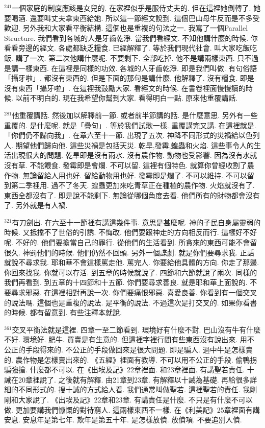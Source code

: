 \documentclass{book}
\begin{document}
$^{241}$一個家庭的制度應該是女兒的.
在家裡似乎是服侍丈夫的.
但在這裡她倒轉了.
她要喝酒.
還要叫丈夫拿東西給她.
所以這一節經文說到.
這個巴山母牛反而是不多受歡迎.
另外我和大家看平衡結構.
這個也是重複的句法之一.
我寫了一個Parallel Structure.
我們看到各城的人是牙齒乾淨.
當我們看經文.
不知他講什麼的時候.
你看看旁邊的經文.
各處都缺乏糧食.
已經解釋了.
等於我們現代社會.
叫大家吃飯吃飯.
講了一次.
第二次他講什麼呢.
不要剩下.
全部吃掉.
他不是講兩樣東西.
只不過是講一樣東西.
在這裡是同樣的功效.
各城的人牙齒乾淨.
即是我們叫做.
有句俗語「攝牙啦」.
都沒有東西的.
但是下面的那句是講什麼.
他解釋了.
沒有糧食.
即是沒有東西「攝牙啦」.
在這裡我鼓勵大家.
看經文的時候.
在書卷裡面慢慢讀的時候.
以前不明白的.
現在我希望你幫到大家.
看得明白一點.
原來他重覆講話.

$^{281}$他重覆講話.
然後加以解釋前一節.
或者前半節講的話.
是什麼意思.
另外有一些重覆的.
是什麼呢.
就是「疊句」.
等於我們試歌一樣.
重覆講完又講.
在這裡就是.
「你們仍不歸向我」.
在章六至十一節.
出現了五次.
神降不同形式的災禍給以色列人.
期望他們歸向他.
這些災禍是包括天災.
乾旱,發霉,蝗蟲和火焰.
這些事令人的生活出現很大的問題.
乾旱即是沒有雨水.
沒有農作物.
動物也受影響.
因為沒有水就沒有草.
不能餵食.
發霉即是會爛.
不可以留.
這裡有個特色.
就算你曾經收割了農作物.
無論留給人用也好.
留給動物用也好.
發霉即是爛了.
不可以維持.
不可以留到第二季裡用.
過不了冬天.
蝗蟲更加來吃青草正在種植的農作物.
火焰就沒有了.
東西全都沒有了.
即是說不能剩下.
無論從哪個角度去看.
他們所有的財物都會沒有了.
另外就是有人禍.

$^{321}$有刀劍出.
在六至十一節裡有講這幾件事.
意思是甚麼呢.
神的子民自身屬靈弱的時候.
又抵擋不了世俗的引誘.
不悔改.
他們要跟神走的方向相反而行.
這樣好不好呢.
不好的.
他們要擔當自己的罪行.
從他們的生活看到.
所貪來的東西可能不會留很久.
神罰他們的時候.
他們仍然不回頭.
另外一個諜劇.
就是你們要尋求我.
正話就說不尋求我.
耶和華不會這樣罵走他.
罵完人.
你要給他具體的方向.
你走了那邊.
你回來找我.
你就可以存活.
到五章的時候就說了.
四節和六節就說了兩次.
同樣的我們再看到.
到五章的十四節和十五節.
你們要尋求善良.
就是耶和華上面說的.
不要尋求邪惡.
在這裡相對再說一次.
你們要痛恨邪惡.
喜愛良善.
你看到有一個交叉的說法嗎.
這個也是重複的說法.
是平衡的說法.
不過這次是打交叉的.
如果你看書的時候.
都有留意到.
有些注釋本就說.

$^{361}$交叉平衡法就是這裡.
四章一至二節看到.
環境好有什麼不對.
巴山沒有牛有什麼不好.
環境好.
肥牛.
買賣是有生意的.
但這裡字裡行間有些東西沒有說出來.
用不公正的手段得來的.
不公正的手段做回來是很大問題.
即是騙人.
過中牛是怎樣賣的.
農作物是怎樣賣出來的.
《五經》裡面有教導.
不可以用不公正的手段.
偷鴨拐騙強搶.
什麼都不可以.
在《出埃及記》22章裡面.
和23章裡面.
有講聖若責任.
十誡在20章裡說了.
之後就有解釋.
由21章到23章.
有解釋以十誡為基礎.
再給很多詳細的不同形式的.
搜十誡的方式給人看.
我們通常叫做聖若.
這裡聖若的責任.
我剛剛和大家說了.
《出埃及記》22章和23章.
有講責任是什麼.
不只是有什麼不可以做.
更加要講我們慷慨的對待窮人.
這兩樣東西不一樣.
在《利美記》25章裡面有講安息.
安息年是第七年.
欺年是第五十年.
是怎樣放債.
放債項.
不要追別人債.
\end{document}
